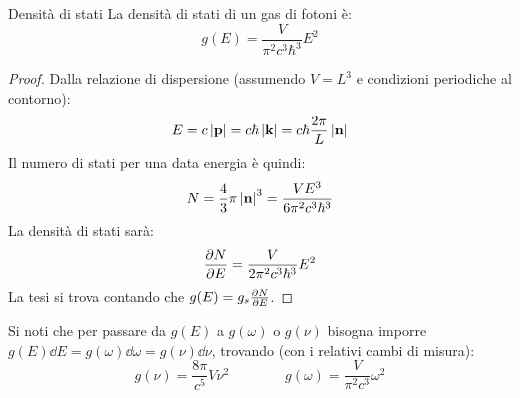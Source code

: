 \begin{proposition}{Densità di stati}{}
	La densità di stati di un gas di fotoni è:
	\begin{equation}
		g(E) = \frac{V}{\pi^2 c^3 \hbar^3} E^2
	\end{equation}

	\tcblower

	\begin{proof}
		Dalla relazione di dispersione (assumendo $ V = L^3 $ e condizioni periodiche al contorno):
		\begin{equation*}
			E = c \left\lvert\mathbf{p}\right\rvert = c \hbar \left\lvert\mathbf{k}\right\rvert = c \hbar \frac{2\pi}{L} \left\lvert\mathbf{n}\right\rvert
		\end{equation*}
		Il numero di stati per una data energia è quindi:
		\begin{equation*}
			N = \frac{4}{3} \pi \left\lvert\mathbf{n}\right\rvert^3 = \frac{V E^3}{6 \pi^2 c^3 \hbar^3}
		\end{equation*}
		La densità di stati sarà:
		\begin{equation*}
			\frac{\partial N}{\partial E} = \frac{V}{2 \pi^2 c^3 \hbar^3} E^2
		\end{equation*}
		La tesi si trova contando che $ g(E) = g_s \frac{\partial N}{\partial E} $.
	\end{proof}
\end{proposition}

Si noti che per passare da $ g(E) $ a $ g(\omega) $ o $ g(\nu) $ bisogna imporre $ g(E) \dd E = g(\omega) \dd \omega = g(\nu) \dd \nu $, trovando (con i relativi cambi di misura):
\begin{equation}
	g(\nu) = \frac{8\pi}{c^5} V \nu^2
	\qquad \qquad
	g(\omega) = \frac{V}{\pi^2 c^3} \omega^2
\end{equation}

